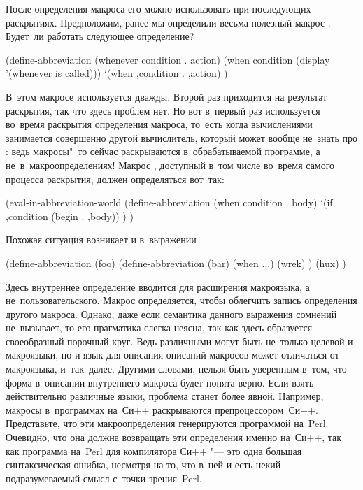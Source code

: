 После определения макроса его можно использовать при последующих раскрытиях.
Предположим, ранее мы определили весьма полезный макрос . Будет~ли
работать следующее определение?

\begin{code:lisp}
(define-abbreviation (whenever condition . action)
  (when condition (display '(whenever is called)))
  `(when ,condition . ,action) )
\end{code:lisp}

В~этом макросе  используется дважды. Второй раз приходится на результат
раскрытия, так что здесь проблем нет. Но вот в~первый раз  используется
во~время раскрытия определения макроса, то~есть когда вычислениями занимается
совершенно другой вычислитель, который может вообще не~знать про : ведь
макросы"~то сейчас раскрываются в~обрабатываемой программе, а
не~в~макроопределениях! Макрос , доступный в~том числе во~время самого
процесса раскрытия, должен определяться вот~так:

\begin{code:lisp}
(eval-in-abbreviation-world
  (define-abbreviation (when condition . body)
    `(if ,condition (begin . ,body)) ) )
\end{code:lisp}

Похожая ситуация возникает и в~выражении

\begin{code:lisp}
(define-abbreviation (foo)
  (define-abbreviation (bar)
    (when ...)
    (wrek) )
  (hux) )
\end{code:lisp}

\noindent
{\def\CPP{Си$+$$+$}%
Здесь внутреннее определение  вводится для расширения макроязыка, а
не~пользовательского. Макрос  определяется, чтобы облегчить запись
определения другого макроса. Однако, даже если семантика данного выражения
сомнений не~вызывает, то его прагматика слегка неясна,
так как здесь образуется своеобразный порочный круг. Ведь различными могут быть
не~только целевой и макроязыки, но и язык для описания описаний макросов может
отличаться от макроязыка, и~так~далее. Другими словами, нельзя быть уверенным
в~том, что форма  в~описании внутреннего макроса  будет понята
верно. Если взять действительно различные языки, проблема станет более явной.
Например, макросы в~программах на~{\CPP} раскрываются препроцессором~{\CPP}.
Представьте, что эти макроопределения генерируются программой на~Perl. Очевидно,
что она должна возвращать эти определения именно на~{\CPP}, так как программа
на~Perl для компилятора {\CPP} "--- это одна большая синтаксическая ошибка,
несмотря на то, что в~ней и есть некий подразумеваемый смысл с~точки
зрения~Perl.}

